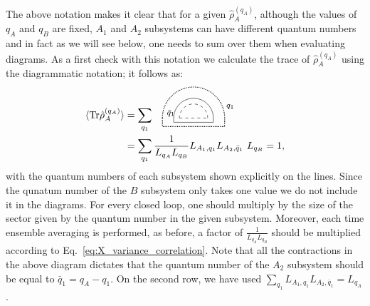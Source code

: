 \documentclass[aps,pra,reprint,superscriptaddress,twocolumn,notitlepage]{revtex4-1}
\newcommand{\Tr}{\text{Tr}}
\numberwithin{equation}{section}
\begin{document}
The above notation makes it clear that for a given $\hat \rho_{A}^{(q_A)}$, although the values of $q_A$ and $q_B$ are fixed, $A_1$ and $A_2$ subsystems can have different quantum numbers and in fact as we will see below, one needs to sum over them when evaluating diagrams. As a first check with this notation we calculate the trace of $\hat\rho_{A}^{(q_A)}$ using the diagrammatic notation; it follows as:
\begin{equation}
\begin{aligned}
    \braket{\Tr\hat\rho_{A}^{(q_A)}} &= \sum_{q_1} \ \
    \,
    \tikz[baseline=0ex]{
    \draw[dashed] (1.0,0) arc (0:180:0.5);
    \draw[dashed] (0,0) -- (1,0);
    \draw (1.2,0.) arc (0:180:0.7);
    \draw (-0.2,0.0)-- (-0.2,-0.15)--(1.2,-0.15)-- (1.2,0.0);
    \draw[densely dotted,thick] (1.6,0) arc (0:180:1.1);
    \draw[densely dotted,thick] (-0.6,0.0)-- (-0.6,-0.3)--(1.6,-0.3)-- (1.6,0.0);
    \draw (1.8,0.4) circle (0.) node[anchor=center] {\footnotesize$q_1$};
    \draw (-0.3,0.17) circle (0.) node[anchor=center] {\footnotesize$\bar{q}_1$};
    }\ \\
    &= \sum_{q_1} \frac{1}{L_{q_A} L_{q_B}} L_{A_1,q_1} L_{A_2,\bar{q}_1} \ L_{q_B}  =  1,
\end{aligned}
\end{equation}
with the quantum numbers of each subsystem shown explicitly on the lines. Since the qunatum number of the $B$ subsystem only takes one value we do not include it in the diagrams. For every closed loop, one should multiply by the size of the sector given by the quantum number in the given subsystem. Moreover, each time ensemble averaging is performed, as before, a factor of $\frac{1}{L_{q_A} L_{q_B}}$ should be multiplied according to Eq.~\eqref{eq:X_variance_correlation}. Note that all the contractions in the above diagram dictates that the quantum number of the $A_2$ subsystem should be equal to $\bar q_1 = q_A - q_1$. On the second row, we have used $\sum_{q_1} L_{A_1,q_1} L_{A_2,\bar{q}_1} = L_{q_A}$. 
\end{document}
